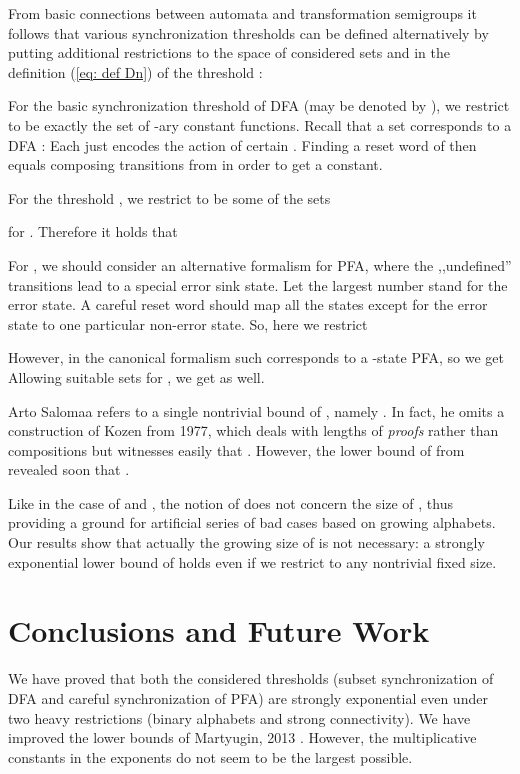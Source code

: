 \documentclass{ws-ijmpc}
\begin{document}
From basic connections between automata and transformation semigroups
it follows that various synchronization thresholds can be defined
alternatively by putting additional restrictions to the space of considered
sets  and  in the definition (\ref{eq: def Dn})
of the threshold :
\begin{romanlist}
\item For the basic synchronization threshold of DFA (may be denoted by
), we restrict 
to be exactly the set of -ary constant functions. Recall
that a set  corresponds
to a DFA :
Each  just encodes the action of certain .
Finding a reset word of  then equals composing transitions from
 in order to get a constant.
\item For the threshold , we restrict 
to be some of the sets 

 for . Therefore
it holds that 
\item For , we should consider an alternative formalism
for PFA, where the ,,undefined'' transitions lead to a special error
sink state. Let the largest number stand for the error state. A careful
reset word should map all the states except for the error state to
one particular non-error state. So, here we restrict 

However, in the canonical formalism such 
corresponds to a -state PFA, so we get 
Allowing suitable sets  for ,
we get  as well.
\end{romanlist}
Arto Salomaa refers to a single nontrivial bound of , namely
. In fact, he omits a construction
of Kozen \citep[Theorem 3.2.7]{KOZ1} from 1977, which deals with
lengths of \emph{proofs} rather than compositions but witnesses easily
that .\textbf{ }However,
the lower bound of  from \citep{ITO1short}
revealed soon that\textbf{ }.\textbf{ }

Like in the case of  and ,
the notion of  does not concern the size of ,
thus providing a ground for artificial series of bad cases based on
growing alphabets. Our results show that actually the growing size
of  is not necessary: a strongly exponential lower bound
of  holds even if we restrict  to any nontrivial
fixed size.


\section{Conclusions and Future Work\label{sec:Conclusions-and-future}}

We have proved that both the considered thresholds (subset synchronization
of DFA and careful synchronization of PFA) are strongly exponential
even under two heavy restrictions (binary alphabets and strong connectivity).
We have improved the lower bounds of Martyugin, 2013 \citep{MAR5}.
However, the multiplicative constants in the exponents do not seem
to be the largest possible. 
\end{document}

